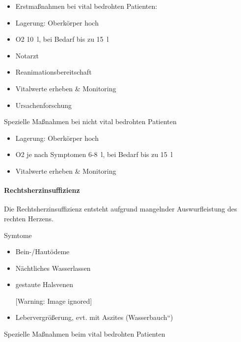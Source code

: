 \documentclass{article}
\begin{document}
\begin{itemize}
\item Erstma{\ss}nahmen bei vital bedrohten Patienten: 

\end{itemize}
\begin{itemize}
\item Lagerung: Oberk\"orper hoch

\item O2 10~l, bei Bedarf bis zu 15~l

\item Notarzt

\item Reanimationsbereitschaft

\item Vitalwerte erheben \& Monitoring 

\end{itemize}
\begin{itemize}
\item Ursachenforschung

\end{itemize}
Spezielle Ma{\ss}nahmen bei nicht vital bedrohten Patienten

\begin{itemize}
\item Lagerung: Oberk\"orper hoch

\item O2 je nach Symptomen 6-8~l, bei Bedarf bis zu 15~l

\item Vitalwerte erheben \& Monitoring 

\end{itemize}
\paragraph{Rechtsherzinsuffizienz}
Die Rechtsherzinsuffizienz entsteht aufgrund mangelnder Auswurfleistung
des rechten Herzens. 

Symtome

\begin{itemize}
\item Bein-/Haut\"odeme

\item N\"achtliches Wasserlassen

\item gestaute Halsvenen 

\begin{center}
 [Warning: Image ignored] %

\end{center}
\item Lebervergr\"o{\ss}erung, evt. mit Aszites
({\quotedblbase}Wasserbauch{\textquotedblleft})

\end{itemize}
Spezielle Ma{\ss}nahmen beim vital bedrohten Patienten
\end{document}
